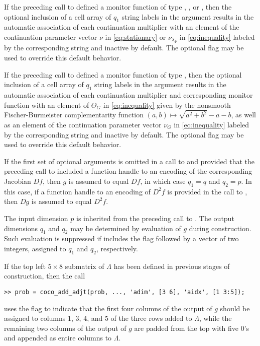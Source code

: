 If the preceding call to  defined a monitor function of type , , or , then the optional inclusion of a cell array of $q_1$ string labels in the  argument results in the automatic association of each continuation multiplier with an element of the continuation parameter vector $\nu$ in \eqref{eq:stationary} or $\nu_{\lambda_\Psi}$ in \eqref{eq:inequality} labeled by the corresponding string and inactive by default. The optional  flag may be used to override this default behavior.

If the preceding call to  defined a monitor function of type , then the optional inclusion of a cell array of $q_1$ string labels in the  argument results in the automatic association of each continuation multiplier and corresponding monitor function with an element of $\Theta_G$ in \eqref{eq:inequality} given by the nonsmooth Fischer-Burmeister complementarity function $(a,b)\mapsto\sqrt{a^2+b^2}-a-b$, as well as an element of the continuation parameter vector $\nu_G$ in \eqref{eq:inequality} labeled by the corresponding string and inactive by default. The optional  flag may be used to override this default behavior. 

If the first set of optional arguments is omitted in a call to  and provided that the preceding call to  included a function handle to an encoding of the corresponding Jacobian $Df$, then $g$ is assumed to equal $Df$, in which case $q_1=q$ and $q_2=p$. In this case, if a function handle to an encoding of $D^2f$ is provided in the call to , then $Dg$ is assumed to equal $D^2f$.


The input dimension $p$ is inherited from the preceding call to . The output dimensions $q_1$ and $q_2$ may be determined by evaluation of $g$ during construction. Such evaluation is suppressed if  includes the flag  followed by a vector of two integers, assigned to $q_1$ and $q_2$, respectively. 

If the top left $5\times 8$ submatrix of $\Lambda$ has been defined in previous stages of construction, then the call
\begin{lstlisting}[language=coco-highlight]
>> prob = coco_add_adjt(prob, ..., 'adim', [3 6], 'aidx', [1 3:5]);
\end{lstlisting}
uses the flag  to indicate that the first four columns of the output of $g$ should be assigned to columns $1$, $3$, $4$, and $5$ of the three rows added to $\Lambda$, while the remaining two columns of the output of $g$ are padded from the top with five $0$'s and appended as entire columns to $\Lambda$.

